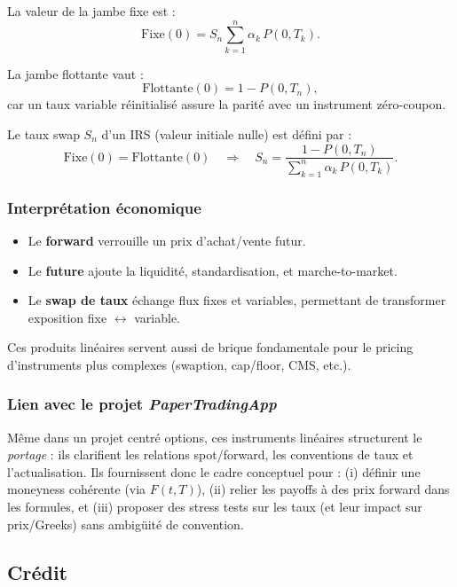 \documentclass[11pt,a4paper]{article}
\newcommand{\1}{\mathbf{1}}
\begin{document}
La valeur de la jambe fixe est :
\[
\mathrm{Fixe}(0)
= S_n \sum_{k=1}^{n} \alpha_k\, P(0,T_k).
\]

La jambe flottante vaut :
\[
\mathrm{Flottante}(0) = 1 - P(0,T_n),
\]
car un taux variable réinitialisé assure la parité avec un instrument zéro-coupon.

Le taux swap $S_n$ d'un IRS (valeur initiale nulle) est défini par :
\[
\mathrm{Fixe}(0) = \mathrm{Flottante}(0)
\quad\Longrightarrow\quad
S_n
=
\frac{1 - P(0,T_n)}{\sum_{k=1}^{n} \alpha_k\, P(0,T_k)}.
\]

\subsubsection{Interprétation économique}

\begin{itemize}
  \item Le \textbf{forward} verrouille un prix d'achat/vente futur.
  \item Le \textbf{future} ajoute la liquidité, standardisation, et marche-to-market.
  \item Le \textbf{swap de taux} échange flux fixes et variables, permettant de
        transformer exposition fixe $\leftrightarrow$ variable.
\end{itemize}

Ces produits linéaires servent aussi de brique fondamentale pour le pricing
d'instruments plus complexes (swaption, cap/floor, CMS, etc.).


\subsubsection{Lien avec le projet \emph{PaperTradingApp}}

M\^eme dans un projet centr\'e options, ces instruments lin\'eaires structurent le \emph{portage} : ils clarifient les relations
spot/forward, les conventions de taux et l'actualisation. Ils fournissent donc le cadre conceptuel pour : (i) d\'efinir une moneyness
coh\'erente (via $F(t,T)$), (ii) relier les payoffs \`a des prix forward dans les formules, et (iii) proposer des stress tests
sur les taux (et leur impact sur prix/Greeks) sans ambig\"uit\'e de convention.

\subsection{Cr\'edit}
\end{document}
